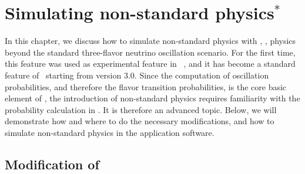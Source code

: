 \chapter{Simulating non-standard physics$^*$}
\label{chapt:nsphysics}

In this chapter, we discuss how to simulate non-standard physics with \GLOBES , \ie, physics
beyond the standard three-flavor neutrino oscillation scenario. For the first time, this feature was used as experimental 
feature in \Ref~\cite{Blennow:2005yk},
and it has become a standard feature of \GLOBES\ starting from version 3.0. Since the 
computation of oscillation probabilities, and therefore the flavor transition probabilities, is the core basic
element of \GLOBES , the introduction of non-standard physics requires familiarity with the
probability calculation in \GLOBES . It is therefore an advanced topic.
Below, we will demonstrate how and where to do the necessary modifications, and how to simulate non-standard
physics in the application software.

\section{Modification of \GLOBES }

